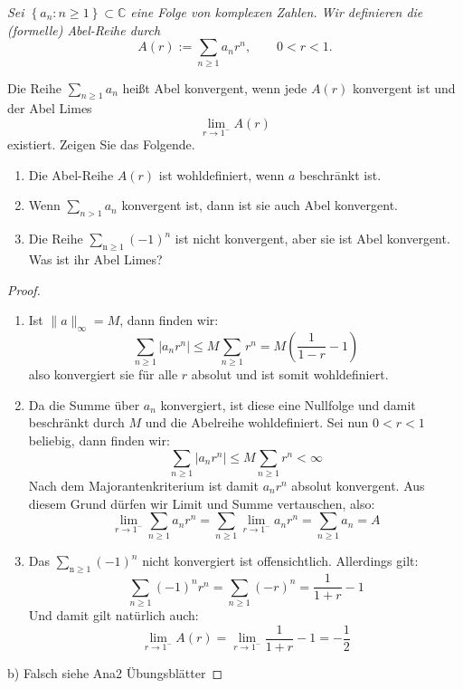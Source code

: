 \documentclass[11pt]{article}
\newenvironment{problem}[2][Beispiel]{
    \begin{trivlist}
        \item[\hskip \labelsep {\bfseries #1}\hskip \labelsep {\bfseries #2.}] \itshape}{
    \end{trivlist}\normalshape
}
\begin{document}
    \begin{problem}{4}
        Sei $\left\{a_n: n \geq 1\right\} \subset \mathbb{C}$ eine Folge von komplexen Zahlen. Wir
        definieren die (formelle) Abel-Reihe durch
        $$
        A(r):=\sum_{n \geq 1} a_n r^n, \qquad 0<r<1 .
        $$

        Die Reihe $\sum_{n \geq 1} a_n$ heißt Abel konvergent, wenn jede $A(r)$ konvergent ist und der
        Abel Limes
        $$
        \lim _{r \rightarrow 1^{-}} A(r)
        $$
        existiert. Zeigen Sie das Folgende.
        \begin{enumerate}[label = (\alph*)]
        \item Die Abel-Reihe $A(r)$ ist wohldefiniert, wenn $a$ beschrānkt ist.
        \item Wenn $\sum_{n>1} a_n$ konvergent ist, dann ist sie auch Abel konvergent.
        \item Die Reihe $\sum_{\mathrm{n} \geq 1}(-1)^n$ ist nicht konvergent, aber sie ist Abel konvergent.
        Was ist ihr Abel Limes?
        \end{enumerate}
    \end{problem}

    \begin{proof}
        \begin{enumerate}[label = (\alph*)]
        \item Ist $\|a\|_\infty = M$, dann finden wir:
        $$\sum_{n \geq 1} |a_n r^n|\leq M \sum_{n \geq 1}r^n =M\left(\frac{1}{1-r}-1\right)$$
        also konvergiert sie für alle $r$ absolut und ist somit wohldefiniert.
        \item Da die Summe über $a_n$ konvergiert, ist diese eine Nullfolge und damit beschränkt
        durch $M$ und die Abelreihe wohldefiniert. Sei nun $0<r<1$ beliebig, dann finden wir:
        $$\sum_{n \geq 1} |a_n r^n|\leq M \sum_{n\geq 1}r^n<\infty$$
        Nach dem Majorantenkriterium ist damit $a_{n}r^n$ absolut konvergent.
        Aus diesem Grund dürfen wir Limit und Summe vertauschen, also:
        $$\lim _{r \rightarrow 1^{-}} \sum_{n \geq 1} a_n r^n =
        \sum_{n \geq 1}\lim _{r \rightarrow 1^{-}} a_n r^n =
        \sum_{n \geq 1} a_n=A$$
        \item Das $\sum_{\mathrm{n} \geq 1}(-1)^n$ nicht konvergiert ist offensichtlich.
        Allerdings gilt:
        $$\sum_{n \geq 1} (-1)^n r^n =\sum_{n \geq 1} (-r)^n = \frac{1}{1+r}-1$$
        Und damit gilt natürlich auch:
        $$\lim _{r \rightarrow 1^{-}} A(r) = \lim _{r \rightarrow 1^{-}}\frac{1}{1+r}-1 =
        -\frac{1}{2}$$
        \end{enumerate}
        b) Falsch siehe Ana2 Übungsblätter
    \end{proof}
\end{document}
